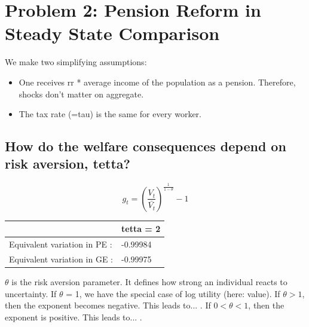 \documentclass[12pt,a4paper]{article}
\begin{document}
\section{Problem 2: Pension Reform in Steady State Comparison}
We make two simplifying assumptions: 
\begin{itemize}
    \item One receives rr * average income of the population as a pension. Therefore, shocks don't matter on aggregate. 
    \item The tax rate (=tau) is the same for every worker.
\end{itemize}

\subsection{How do the welfare consequences depend on risk aversion, tetta?}

$$ g_t = ( \frac{V_t}{\bar{V_t}})^\frac{1}{1-\theta}-1 $$

\begin{center}
\begin{tabular}{ |l|l| } 
\hline
 & tetta = 2 \\ %
\hline
Equivalent variation in PE : & -0.99984 \\ %
\hline
Equivalent variation in GE : &  -0.99975 \\ %
\hline
\end{tabular}
\end{center}

$\theta$ is the risk aversion parameter. It defines how strong an individual reacts to uncertainty. If $\theta$ = 1, we have the special case of log utility (here: value). If $\theta > 1$, then the exponent becomes negative. This leads to... . If $0 < \theta < 1$, then the exponent is positive. This leads to... .

\end{document}
